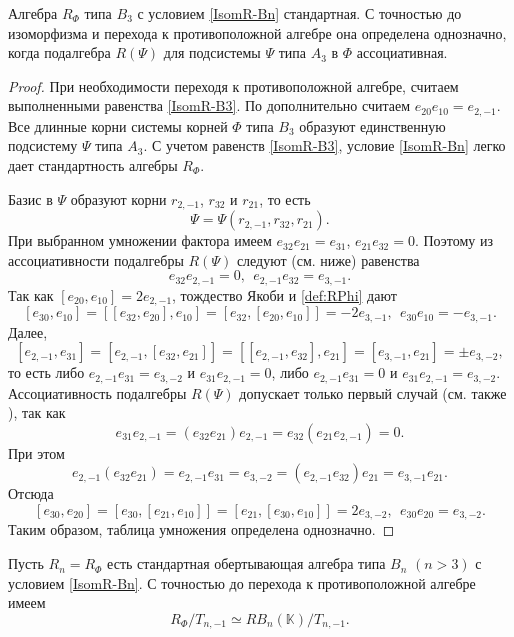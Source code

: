 \documentclass[a4paper,14pt,oneside,openany]{memoir}
\begin{document}
\begin{lemma}\label{l:Subsistem-B3}
    Алгебра $R_{\Phi}$ типа $B_3$ с условием \eqref{IsomR-Bn} стандартная. С
    точностью до изоморфизма и перехода к противоположной алгебре она определена
    однозначно, когда подалгебра $R(\Psi)$ для подсистемы $\Psi$ типа $A_3$ в
    $\Phi$ ассоциативная.
\end{lemma}

\begin{proof}
    При необходимости переходя к противоположной алгебре, считаем выполненными
    равенства \eqref{IsomR-B3}. По  дополнительно считаем
    $e_{20}e_{10}=e_{2,-1}$. Все длинные корни системы корней $\Phi$ типа $B_3$
    образуют единственную подсистему $\Psi$ типа $A_3$. С учетом равенств
    \eqref{IsomR-B3}, условие \eqref{IsomR-Bn} легко дает стандартность алгебры
    $R_{\Phi}$.

    Базис в $\Psi$ образуют корни $r_{2,-1}$, $r_{32}$ и $r_{21}$, то есть
    \[
        \Psi= \Psi(r_{2,-1}, r_{32}, r_{21}).
    \]
    При выбранном умножении фактора имеем $e_{32} e_{21}= e_{31}$, $e_{21} e_{32} =
    0$. Поэтому из ассоциативности подалгебры $R(\Psi)$ следуют (см. ниже)
    равенства
    \[
        e_{32}e_{2, - 1}=0,\ \ e_{2,-1}e_{32} = e_{3,-1}.
    \]
    Так как $[e_{20},e_{10}]=2e_{2,-1}$, тождество Якоби и \cref{def:RPhi} дают
    \[ [e_{30},e_{10}]=[[e_{32},e_{20}],e_{10}]=[e_{32},[e_{20},e_{10}]]=
        -2e_{3,-1},\ \ e_{30}e_{10}=-e_{3,-1}.\]
    Далее,
    \[[e_{2,-1},e_{31}]=[e_{2,-1},[e_{32},e_{21}]]=[[e_{2,-1},e_{32}],e_{21}]=[e_{3,-1},e_{21}]
        =\pm e_{3,-2},\]
    то есть либо $e_{2,-1}e_{31} = e_{3,-2}$ и $e_{31}e_{2,-1} = 0$, либо
    $e_{2,-1}e_{31} = 0$ и $e_{31}e_{2,-1} = e_{3,-2}$.
    Ассоциативность подалгебры $R(\Psi)$ допускает только первый случай (см. также
    ), так как
    \[
        e_{31}e_{2,-1}=(e_{32}e_{21})e_{2,-1}=e_{32}(e_{21}e_{2,-1})=0.
    \]
    При этом
    \[e_{2,-1}(e_{32}e_{21})=e_{2,-1}e_{31}=e_{3,-2}=
        (e_{2,-1}e_{32})e_{21}=e_{3,-1}e_{21}. \]
    Отсюда
    \[ [e_{30},e_{20}]=[e_{30},[e_{21},e_{10}]]=[e_{21},[e_{30},e_{10}]]=
        2e_{3,-2},\ \ e_{30}e_{20}=e_{3,-2}.\]
    Таким образом, таблица умножения определена однозначно.
\end{proof}

\begin{lemma}\label{l:Subsistem-Bn}
    Пусть $R_n=R_{\Phi}$ есть стандартная обертывающая алгебра типа $B_n$ $(n > 3)$
    с условием \eqref{IsomR-Bn}. С точностью до перехода к противоположной алгебре
    имеем
    \[
        R_{\Phi}/T_{n,-1}\simeq RB_n(\mathbb{K})/T_{n,-1}.
    \]
\end{lemma}
\end{document}
